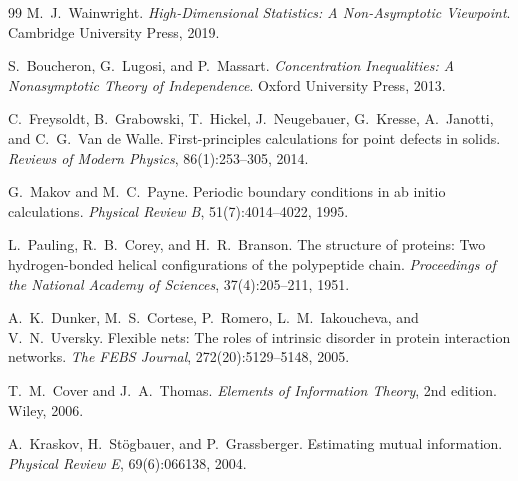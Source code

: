 \documentclass[11pt,a4paper]{article}
\theoremstyle{remark}
\begin{document}
\begin{thebibliography}{99}
M.~J.~Wainwright.
\newblock \emph{High-Dimensional Statistics: A Non-Asymptotic Viewpoint}.
\newblock Cambridge University Press, 2019.

S.~Boucheron, G.~Lugosi, and P.~Massart.
\newblock \emph{Concentration Inequalities: A Nonasymptotic Theory of
  Independence}.
\newblock Oxford University Press, 2013.

C.~Freysoldt, B.~Grabowski, T.~Hickel, J.~Neugebauer, G.~Kresse,
A.~Janotti, and C.~G.~Van de Walle.
\newblock First-principles calculations for point defects in solids.
\newblock \emph{Reviews of Modern Physics}, 86(1):253--305, 2014.

G.~Makov and M.~C.~Payne.
\newblock Periodic boundary conditions in ab initio calculations.
\newblock \emph{Physical Review B}, 51(7):4014--4022, 1995.

L.~Pauling, R.~B.~Corey, and H.~R.~Branson.
\newblock The structure of proteins: Two hydrogen-bonded helical configurations
  of the polypeptide chain.
\newblock \emph{Proceedings of the National Academy of Sciences},
  37(4):205--211, 1951.

A.~K.~Dunker, M.~S.~Cortese, P.~Romero, L.~M.~Iakoucheva, and V.~N.~Uversky.
\newblock Flexible nets: The roles of intrinsic disorder in protein interaction
  networks.
\newblock \emph{The FEBS Journal}, 272(20):5129--5148, 2005.

T.~M.~Cover and J.~A.~Thomas.
\newblock \emph{Elements of Information Theory}, 2nd edition.
\newblock Wiley, 2006.

A.~Kraskov, H.~St\"{o}gbauer, and P.~Grassberger.
\newblock Estimating mutual information.
\newblock \emph{Physical Review E}, 69(6):066138, 2004.

\end{thebibliography}

\end{document}
